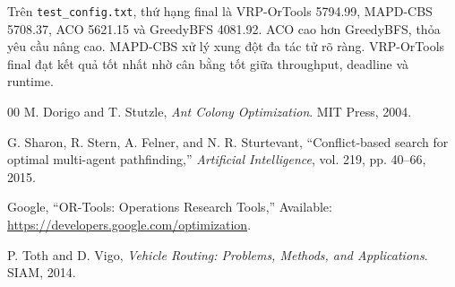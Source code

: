 \documentclass[conference]{IEEEtran}
\newcommand{\code}[1]{\texttt{#1}}
\begin{document}
Trên \code{test\_config.txt}, thứ hạng final là VRP-OrTools 5794.99, MAPD-CBS 5708.37, ACO 5621.15 và GreedyBFS 4081.92. ACO cao hơn GreedyBFS, thỏa yêu cầu nâng cao. MAPD-CBS xử lý xung đột đa tác tử rõ ràng. VRP-OrTools final đạt kết quả tốt nhất nhờ cân bằng tốt giữa throughput, deadline và runtime.

\begin{thebibliography}{00}
M. Dorigo and T. Stutzle, \textit{Ant Colony Optimization}. MIT Press, 2004.

G. Sharon, R. Stern, A. Felner, and N. R. Sturtevant, ``Conflict-based search for optimal multi-agent pathfinding,'' \textit{Artificial Intelligence}, vol. 219, pp. 40--66, 2015.

Google, ``OR-Tools: Operations Research Tools,'' Available: \url{https://developers.google.com/optimization}.

P. Toth and D. Vigo, \textit{Vehicle Routing: Problems, Methods, and Applications}. SIAM, 2014.
\end{thebibliography}
\end{document}
